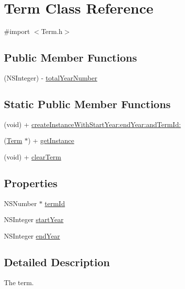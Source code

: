 \hypertarget{interface_term}{\section{\-Term \-Class \-Reference}
\label{interface_term}
}


{\ttfamily \#import $<$\-Term.\-h$>$}

\subsection*{\-Public \-Member \-Functions}
\begin{DoxyCompactItemize}
\item 
(\-N\-S\-Integer) -\/ \hyperlink{interface_term_ae7418c7e7d2d690f10d789fdcf77bd1d}{total\-Year\-Number}
\end{DoxyCompactItemize}
\subsection*{\-Static \-Public \-Member \-Functions}
\begin{DoxyCompactItemize}
\item 
(void) + \hyperlink{interface_term_ac2d139ddaf21d295e532930469acba21}{create\-Instance\-With\-Start\-Year\-:end\-Year\-:and\-Term\-Id\-:}
\item 
(\hyperlink{interface_term}{\-Term} $\ast$) + \hyperlink{interface_term_a4cd86e0f1005b3506cca47654a8be9bb}{get\-Instance}
\item 
(void) + \hyperlink{interface_term_ae115c46bc052f8f55e5175a497960be4}{clear\-Term}
\end{DoxyCompactItemize}
\subsection*{\-Properties}
\begin{DoxyCompactItemize}
\item 
\-N\-S\-Number $\ast$ \hyperlink{interface_term_a1beacd986e807047abb0da06dd10e5fa}{term\-Id}
\item 
\-N\-S\-Integer \hyperlink{interface_term_a28f6215d7c7ae2f56b9fb2299ef586f8}{start\-Year}
\item 
\-N\-S\-Integer \hyperlink{interface_term_a3143ae8c527f7ca31d687a60742d908b}{end\-Year}
\end{DoxyCompactItemize}


\subsection{\-Detailed \-Description}
\-The term. 

